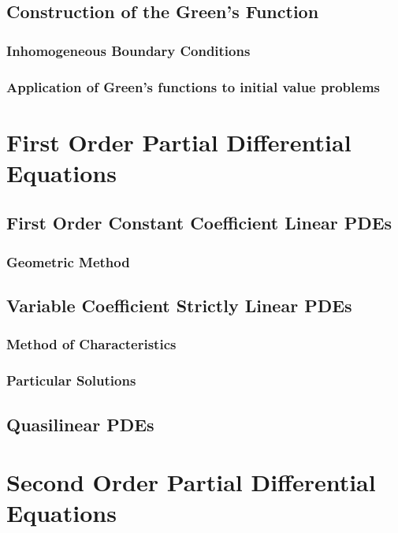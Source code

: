 \documentclass{article}
\theoremstyle{plain}
\theoremstyle{definition}
\numberwithin{equation}{section}
\begin{document}
\subsection{Construction of the Green's Function}

\subsubsection{Inhomogeneous Boundary Conditions}

\subsubsection{Application of Green's functions to initial value problems}

\section{First Order Partial Differential Equations}

\subsection{First Order Constant Coefficient Linear PDEs}

\subsubsection{Geometric Method}

\subsection{Variable Coefficient Strictly Linear PDEs}

\subsubsection{Method of Characteristics}

\subsubsection{Particular Solutions}

\subsection{Quasilinear PDEs}

\section{Second Order Partial Differential Equations}
\end{document}
